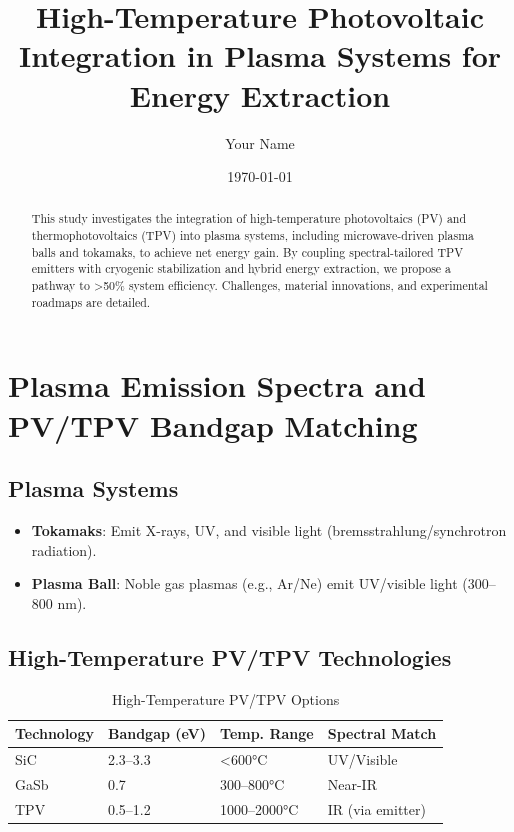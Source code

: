 \documentclass{article}
\title{High-Temperature Photovoltaic Integration in Plasma Systems for Energy Extraction}
\author{Your Name}
\date{\today}
\begin{document}
\maketitle

\begin{abstract}
This study investigates the integration of high-temperature photovoltaics (PV) and thermophotovoltaics (TPV) into plasma systems, including microwave-driven plasma balls and tokamaks, to achieve net energy gain. By coupling spectral-tailored TPV emitters with cryogenic stabilization and hybrid energy extraction, we propose a pathway to >50\% system efficiency. Challenges, material innovations, and experimental roadmaps are detailed.
\end{abstract}

\section{Plasma Emission Spectra and PV/TPV Bandgap Matching}
\label{sec:spectra}

\subsection{Plasma Systems}
\begin{itemize}
    \item \textbf{Tokamaks}: Emit X-rays, UV, and visible light (bremsstrahlung/synchrotron radiation).
    \item \textbf{Plasma Ball}: Noble gas plasmas (e.g., Ar/Ne) emit UV/visible light (300–800 nm).
\end{itemize}

\subsection{High-Temperature PV/TPV Technologies}
\begin{table}[ht]
    \centering
    \caption{High-Temperature PV/TPV Options}
    \label{tab:pv_tpv}
    \begin{tabular}{llll}
        \toprule
        \textbf{Technology} & \textbf{Bandgap (eV)} & \textbf{Temp. Range} & \textbf{Spectral Match} \\
        \midrule
        SiC & 2.3–3.3 & <600°C & UV/Visible \\
        GaSb & 0.7 & 300–800°C & Near-IR \\
        TPV & 0.5–1.2 & 1000–2000°C & IR (via emitter) \\
        \bottomrule
    \end{tabular}
\end{table}
\end{document}
